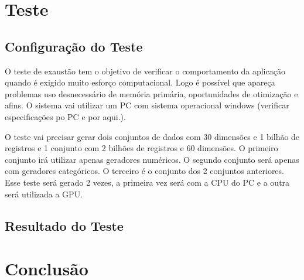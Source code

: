\documentclass[
	12pt,				%
	openright,			%
	twoside,			%
	a4paper,			%
	english,			%
	brazil				%
	]{abntex2}
\begin{document}
\chapter{Teste}

	\section{Configuração do Teste}
	O teste de exaustão tem o objetivo de verificar o comportamento da aplicação quando é exigido muito esforço computacional.
	Logo é possível que apareça problemas uso desnecessário de memória primária, oportunidades de otimização e afins.
	O sistema vai utilizar um PC com sistema operacional windows (verificar especificações po PC e por aqui.).
	\par
	O teste vai precisar gerar dois conjuntos de dados com 30 dimensões e 1 bilhão de registros e 1 conjunto com 2 bilhões de registros e 60 dimensões.
	O primeiro conjunto irá utilizar apenas geradores numéricos.
	O segundo conjunto será apenas com geradores categóricos.
	O terceiro é o conjunto dos 2 conjuntos anteriores.
	Esse teste será gerado 2 vezes, a primeira vez será com a CPU do PC e a outra será utilizada a GPU.
	\section{Resultado do Teste}
\chapter{Conclusão}

\lipsum[31-33]

\postextual


\end{document}
